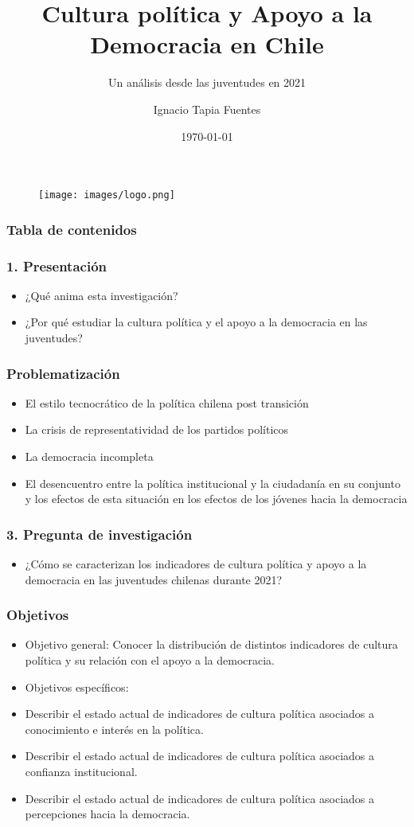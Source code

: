 \documentclass[12pt]{beamer}
\title{Cultura política y Apoyo a la Democracia en Chile}
\subtitle{Un análisis desde las juventudes en 2021}
\author{Ignacio Tapia Fuentes}
\institute{Profesor guía: Rodrigo Medel Sierralta \and
Profesora informante: Federica Sánchez Staniak \and
Ayudante de cátedra: Camila Rodríguez Peña}
\date{\today}
\begin{document}
\begin{frame}
\titlepage
\begin{figure}
\centering
\texttt{[image: images/logo.png]}
\end{figure}
\end{frame}

\begin{frame}
\frametitle{Tabla de contenidos}
\tableofcontents
\end{frame}

\begin{frame}
\frametitle{1. Presentación}
\begin{itemize}
\item ¿Qué anima esta investigación?
\item ¿Por qué estudiar la cultura política y el apoyo a la democracia en las juventudes?
\end{itemize}
\end{frame}

\begin{frame}
\frametitle{Problematización}
\begin{itemize}
\item El estilo tecnocrático de la política chilena post transición
\item La crisis de representatividad de los partidos políticos
\item La democracia incompleta
\item El desencuentro entre la política institucional y la ciudadanía en su conjunto y los efectos de esta situación en los efectos de los jóvenes hacia la democracia
\end{itemize}
\end{frame}

\begin{frame}
\frametitle{3. Pregunta de investigación}
\begin{itemize}
\item ¿Cómo se caracterizan los indicadores de cultura política y apoyo a la democracia en las juventudes chilenas durante 2021?
\end{itemize}
\end{frame}

\begin{frame}
\frametitle{Objetivos}
\begin{itemize}
\item  Objetivo general: Conocer la distribución de distintos indicadores de cultura política y su relación con el apoyo a la democracia.
\item Objetivos específicos:
\item Describir el estado actual de indicadores de cultura política asociados a conocimiento e interés en la política.
\item  Describir el estado actual de indicadores de cultura política asociados a confianza institucional.
\item Describir el estado actual de indicadores de cultura política asociados a percepciones hacia la democracia.
\end{itemize}
\end{frame}
\end{document}
